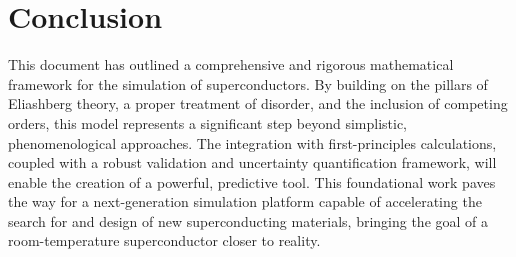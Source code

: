 \section{Conclusion}
This document has outlined a comprehensive and rigorous mathematical framework for the simulation of superconductors. By building on the pillars of Eliashberg theory, a proper treatment of disorder, and the inclusion of competing orders, this model represents a significant step beyond simplistic, phenomenological approaches. The integration with first-principles calculations, coupled with a robust validation and uncertainty quantification framework, will enable the creation of a powerful, predictive tool. This foundational work paves the way for a next-generation simulation platform capable of accelerating the search for and design of new superconducting materials, bringing the goal of a room-temperature superconductor closer to reality.
